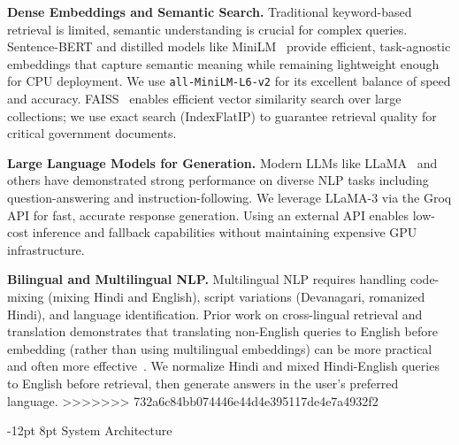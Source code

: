 \documentclass[10pt,twocolumn]{article}
\makeatletter
\renewcommand{\section}{\@startsection{section}{1}{\z@}%
  {-12pt \@plus -2pt \@minus -1pt}%
  {8pt \@plus 0.3pt}%
  {\normalfont\Large\bfseries}}
\makeatother
\begin{document}
\medskip\noindent\textbf{Dense Embeddings and Semantic Search.}
Traditional keyword-based retrieval is limited, semantic understanding is crucial for complex queries. Sentence-BERT and distilled models like MiniLM~\cite{reimers2019sentence,wang2020minilm} provide efficient, task-agnostic embeddings that capture semantic meaning while remaining lightweight enough for CPU deployment. We use \texttt{all-MiniLM-L6-v2} for its excellent balance of speed and accuracy. FAISS~\cite{johnson2019billion} enables efficient vector similarity search over large collections; we use exact search (IndexFlatIP) to guarantee retrieval quality for critical government documents.

\medskip\noindent\textbf{Large Language Models for Generation.}
Modern LLMs like LLaMA~\cite{touvron2023llama} and others have demonstrated strong performance on diverse NLP tasks including question-answering and instruction-following. We leverage LLaMA-3 via the Groq API for fast, accurate response generation. Using an external API enables low-cost inference and fallback capabilities without maintaining expensive GPU infrastructure.

\medskip\noindent\textbf{Bilingual and Multilingual NLP.}
Multilingual NLP requires handling code-mixing (mixing Hindi and English), script variations (Devanagari, romanized Hindi), and language identification. Prior work on cross-lingual retrieval and translation demonstrates that translating non-English queries to English before embedding (rather than using multilingual embeddings) can be more practical and often more effective~\cite{reimers2019sentence}. We normalize Hindi and mixed Hindi-English queries to English before retrieval, then generate answers in the user's preferred language.
>>>>>>> 732a6c84bb074446e44d4e395117de4e7a4932f2

\section{System Architecture}
\end{document}
